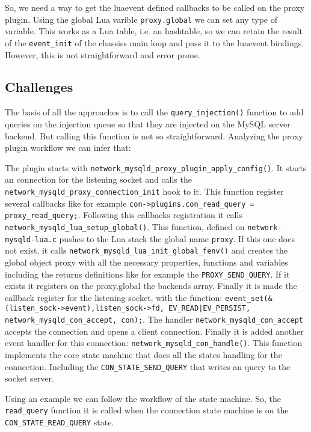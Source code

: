 So, we need a way to get the luaevent defined callbacks to be called on the proxy plugin. Using the global Lua varible \texttt{proxy.global} we can set any type of variable. This works as a Lua table, i.e. an hashtable, so we can retain the result of the \texttt{event\_init} of the chassiss main loop and pass it to the luaevent bindings. However, this is not straightforward and error prone.



\subsection{Challenges}

The basis of all the approaches is to call the \texttt{query\_injection()} function to add queries on the injection queue so that they are injected on the 
MySQL server backend. But calling this function is not so straightforward. Analyzing the proxy plugin workflow we can infer that:

The plugin starts with \texttt{network\_mysqld\_proxy\_plugin\_apply\_config()}. It starts an connection for the listening socket and calls the 
\texttt{network\_mysqld\_proxy\_connection\_init} hook to it. This function register several callbacks like for example \texttt{con->plugins.con\-\_read\_query = 
proxy\_read\_query;}. Following this callbacks registration it calls \texttt{network\-\_mysqld\_lua\_setup\_global()}. This function, defined on 
\texttt{network-mysqld-lua.c} pushes to the Lua stack the global name \texttt{proxy}. If this one does not exist, it calls \texttt{network\-\_mysqld\_lua\_init\_global\_fenv()} 
and creates the global object proxy with all the necessary properties, functions and variables including the returns definitions like for example the 
\texttt{PROXY\_SEND\_QUERY}. If it exists it registers on the proxy.global the backends array. Finally it is made the callback register for the listening socket, 
with the function: \texttt{event\_set(\&(listen\-\_sock->event),listen\_sock->fd, EV\_READ|EV\_PERSIST, network\-\_mysqld\_con\-\_accept, con);}. The handler 
\texttt{network\_mysqld\_con\_accept} accepts the connection and opens a client connection. Finally it is added another event handler for this connection: 
\texttt{network\-\_mysqld\_con\_handle()}. This function implements the core state machine that does all the states handling for the connection. Including the 
\texttt{CON\_STATE\_SEND\-\_QUERY} that writes an query to the socket server.

Using an example we can follow the workflow of the state machine. So, the \texttt{read\-\_query} function it is called when the connection state machine is on the 
\texttt{CON\_STATE\-\_READ\_QUERY} state. 

